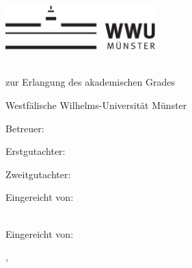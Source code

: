 \thispagestyle{empty}

\begin{center}
    \includegraphics[height=1.7cm]{logos/wwu.pdf}
    \hfill
    \par
    \vspace*{8ex}
    {
        \linespread{0.9}
        \LARGE
        \printtitle
        \par
    }
    \normalsize
    \vspace*{8ex}
    \large
    \textsc{\printtype}\\
    \normalsize
    zur Erlangung des akademischen Grades\\
    \large
    \textsc{\printdegree}
    \par
    \normalsize
    \vspace*{6ex}
    Westfälische Wilhelms-Universität Münster\\
    \printinstitute
\end{center}

\par
\vspace*{6ex}
Betreuer:\\
\large
\textit{\printsupervisor}

\par
\normalsize
\vspace*{2ex}
Erstgutachter:\\
\large
\textit{\printfirstassessor}

\par
\normalsize
\vspace*{2ex}
Zweitgutachter:\\
\large
\textit{\printsecondassessor}

\par
\normalsize
\vspace*{2ex}
Eingereicht von:\\
\large
\textit{\printname} \\

\begin{center}
\par
\normalsize
\vspace*{2ex}
Eingereicht von:\\
\large
\textit{\printname}

\end{center}


\par
\normalsize
\vspace*{4ex}
\printcity, \makeatletter
\monthname
\makeatother~\the\year
